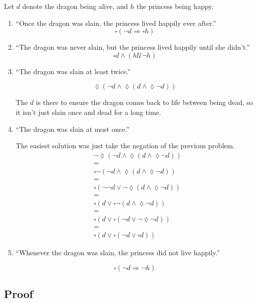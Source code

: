 \documentclass{article}
\begin{document}
Let $d$ denote the dragon being alive, and $h$ the princess being happy.
\begin{enumerate}
  \item {
    ``Once the dragon was slain, the princess lived happily ever after.''
    $$\square(\neg d \Rightarrow \square h)$$
  }
  \item {
    ``The dragon was never slain, but the princess lived happily until she didn't.''
    $$\square d \wedge (h \mathrel{\mathcal{U}} \neg h)$$
  }
  \item {
    ``The dragon was slain at least twice.''

    $$\lozenge(\neg d \wedge \lozenge(d \wedge \lozenge\neg d))$$

    The $d$ is there to ensure the dragon comes back to life between being dead,
    so it isn't just slain once and dead for a long time.
  }
  \item {
    ``The dragon was slain at most once.''

    The easiest solution was just take the negation of the previous problem.
    \begin{align*}
      &\neg \lozenge(\neg d \wedge \lozenge(d \wedge \lozenge\neg d)) \\
      &= \\
      &\square \neg (\neg d \wedge \lozenge(d \wedge \lozenge\neg d)) \\
      &= \\
      &\square (\neg\neg d \vee \neg\lozenge(d \wedge \lozenge\neg d)) \\
      &= \\
      &\square (d \vee \square\neg(d \wedge \lozenge\neg d)) \\
      &= \\
      &\square (d \vee \square(\neg d \vee \neg\lozenge\neg d)) \\
      &= \\
      &\square (d \vee \square(\neg d \vee \square d))
    \end{align*}
  }
  \item {
    ``Whenever the dragon was slain, the princess did not live happily.''

    $$\square(\neg d \Rightarrow \neg h)$$
  }
\end{enumerate}

\subsection{Proof}
\end{document}
